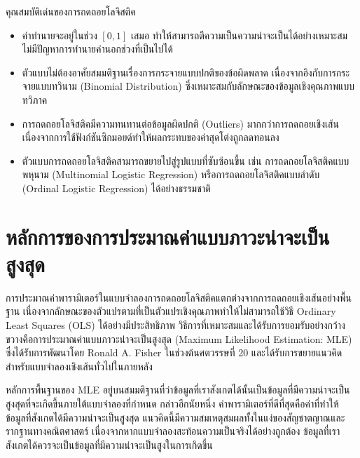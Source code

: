 \begin{myLimit}[]{คุณสมบัติเด่นของการถดถอยโลจิสติค}{}
	\begin{itemize}
		\item ค่าทำนายจะอยู่ในช่วง $[0, 1]$ เสมอ ทำให้สามารถตีความเป็นความน่าจะเป็นได้อย่างเหมาะสม ไม่มีปัญหาการทำนายค่านอกช่วงที่เป็นไปได้
		 
		\item ตัวแบบไม่ต้องอาศัยสมมติฐานเรื่องการกระจายแบบปกติของข้อผิดพลาด เนื่องจากอิงกับการกระจายแบบทวินาม (Binomial Distribution) ซึ่งเหมาะสมกับลักษณะของข้อมูลเชิงคุณภาพแบบทวิภาค
		
		\item การถดถอยโลจิสติคมีความทนทานต่อข้อมูลผิดปกติ (Outliers) มากกว่าการถดถอยเชิงเส้น เนื่องจากการใช้ฟังก์ชันซิกมอยด์ทำให้ผลกระทบของค่าสุดโต่งถูกลดทอนลง 
		
		
		\item ตัวแบบการถดถอยโลจิสติคสามารถขยายไปสู่รูปแบบที่ซับซ้อนขึ้น เช่น การถดถอยโลจิสติคแบบพหุนาม (Multinomial Logistic Regression) หรือการถดถอยโลจิสติคแบบลำดับ (Ordinal Logistic Regression) ได้อย่างธรรมชาติ
	\end{itemize}
\end{myLimit}

\section{หลักการของการประมาณค่าแบบภาวะน่าจะเป็นสูงสุด}

การประมาณค่าพารามิเตอร์ในแบบจำลองการถดถอยโลจิสติคแตกต่างจากการถดถอยเชิงเส้นอย่างพื้นฐาน เนื่องจากลักษณะของตัวแปรตามที่เป็นตัวแปรเชิงคุณภาพทำให้ไม่สามารถใช้วิธี Ordinary Least Squares (OLS) ได้อย่างมีประสิทธิภาพ วิธีการที่เหมาะสมและได้รับการยอมรับอย่างกว้างขวางคือการประมาณค่าแบบภาวะน่าจะเป็นสูงสุด (Maximum Likelihood Estimation: MLE) ซึ่งได้รับการพัฒนาโดย Ronald A. Fisher ในช่วงต้นศตวรรษที่ 20 และได้รับการขยายแนวคิดสำหรับแบบจำลองเชิงเส้นทั่วไปในภายหลัง

หลักการพื้นฐานของ MLE อยู่บนสมมติฐานที่ว่าข้อมูลที่เราสังเกตได้นั้นเป็นข้อมูลที่มีความน่าจะเป็นสูงสุดที่จะเกิดขึ้นภายใต้แบบจำลองที่กำหนด กล่าวอีกนัยหนึ่ง ค่าพารามิเตอร์ที่ดีที่สุดคือค่าที่ทำให้ข้อมูลที่สังเกตได้มีความน่าจะเป็นสูงสุด แนวคิดนี้มีความสมเหตุสมผลทั้งในแง่ของสัญชาตญาณและรากฐานทางคณิตศาสตร์ เนื่องจากหากแบบจำลองสะท้อนความเป็นจริงได้อย่างถูกต้อง ข้อมูลที่เราสังเกตได้ควรจะเป็นข้อมูลที่มีความน่าจะเป็นสูงในการเกิดขึ้น




